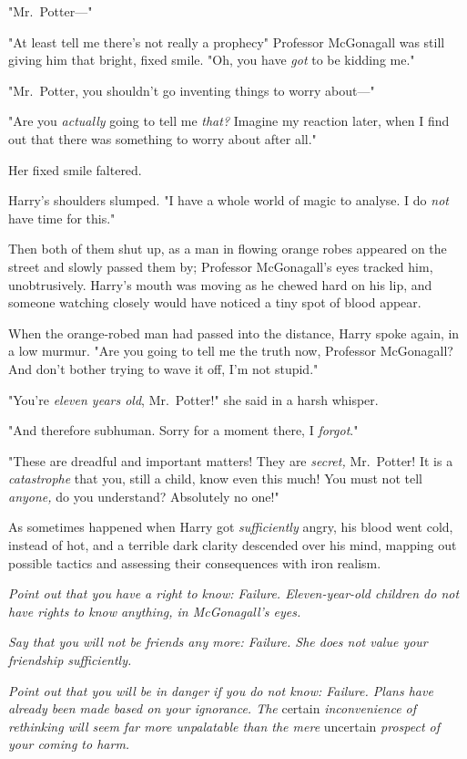 "Mr.~Potter—"

"At least tell me there's not really a prophecy{\el}" Professor McGonagall
was still giving him that bright, fixed smile. "Oh, you have \emph{got} to be
kidding me."

"Mr.~Potter, you shouldn't go inventing things to worry about—"

"Are you \emph{actually} going to tell me \emph{that?} Imagine my reaction
later, when I find out that there was something to worry about after all."

Her fixed smile faltered.

Harry's shoulders slumped. "I have a whole world of magic to analyse. I do
\emph{not} have time for this."

Then both of them shut up, as a man in flowing orange robes appeared on the
street and slowly passed them by; Professor McGonagall's eyes tracked him,
unobtrusively. Harry's mouth was moving as he chewed hard on his lip, and
someone watching closely would have noticed a tiny spot of blood appear.

When the orange-robed man had passed into the distance, Harry spoke again, in a
low murmur. "Are you going to tell me the truth now, Professor McGonagall? And
don't bother trying to wave it off, I'm not stupid."

"You're \emph{eleven years old}, Mr.~Potter!" she said in a harsh whisper.

"And therefore subhuman. Sorry{\el} for a moment there, I \emph{forgot}."

"These are dreadful and important matters! They are \emph{secret,} Mr.~Potter!
It is a \emph{catastrophe} that you, still a child, know even this much! You
must not tell \emph{anyone,} do you understand? Absolutely no one!"

As sometimes happened when Harry got \emph{sufficiently} angry, his blood went
cold, instead of hot, and a terrible dark clarity descended over his mind,
mapping out possible tactics and assessing their consequences with iron realism.

\emph{Point out that you have a right to know: Failure. Eleven-year-old
children do not have rights to know anything, in McGonagall's eyes.}

\emph{Say that you will not be friends any more: Failure. She does not value
your friendship sufficiently.}

\emph{Point out that you will be in danger if you do not know: Failure. Plans
have already been made based on your ignorance. The} certain
\emph{inconvenience of rethinking will seem far more unpalatable than the mere}
uncertain \emph{prospect of your coming to harm.}

